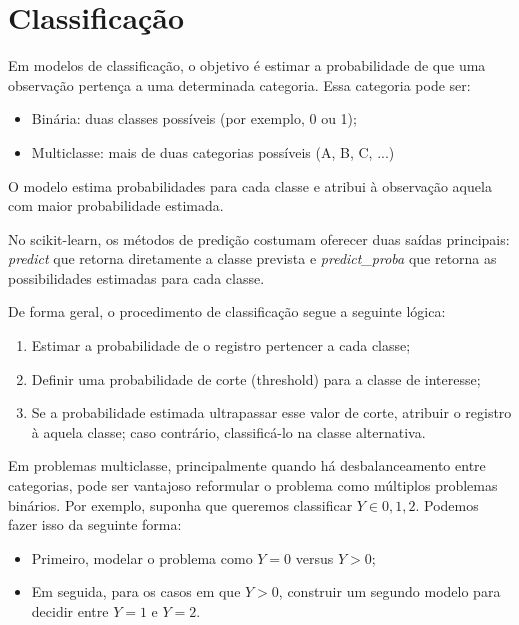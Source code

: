 \documentclass{article}
\begin{document}
\section{Classificação}

Em modelos de classificação, o objetivo é estimar a probabilidade de que uma observação
pertença a uma determinada categoria. Essa categoria pode ser:

\begin{itemize}
    \item Binária: duas classes possíveis (por exemplo, 0 ou 1);
    \item Multiclasse: mais de duas categorias possíveis (A, B, C, ...)
\end{itemize}

O modelo estima probabilidades para cada classe e atribui à observação 
aquela com maior probabilidade estimada. 

No scikit-learn, os métodos de predição costumam oferecer duas saídas principais:
\textit{predict} que retorna diretamente a classe prevista e \textit{predict\_proba} que 
retorna as possibilidades estimadas para cada classe. 

De forma geral, o procedimento de classificação segue a seguinte lógica:

\begin{enumerate}
    \item Estimar a probabilidade de o registro pertencer a cada classe;
    \item Definir uma probabilidade de corte (threshold) para a classe de interesse;
    \item Se a probabilidade estimada ultrapassar esse valor de corte, atribuir o registro à aquela classe; caso contrário, classificá-lo na classe alternativa.
\end{enumerate}

Em problemas multiclasse, principalmente quando há desbalanceamento entre categorias, pode
ser vantajoso reformular o problema como múltiplos problemas binários. Por exemplo, suponha que
queremos classificar $Y \in {0, 1, 2}$. Podemos fazer isso da seguinte forma:

\begin{itemize}
    \item Primeiro, modelar o problema como $Y = 0$ versus $Y > 0$;
    \item Em seguida, para os casos em que $Y > 0$, construir um segundo modelo para decidir entre $Y = 1$ e $Y = 2$.
\end{itemize}
\end{document}
